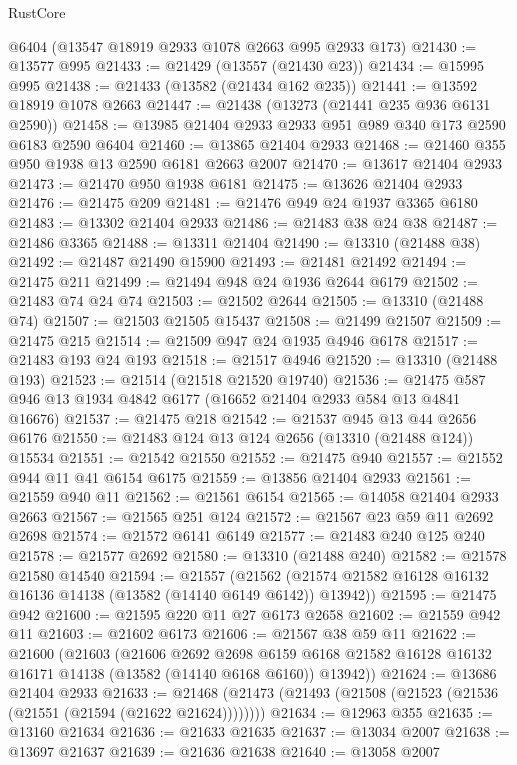 \begin{lexlean}{RustCore}
\begin{coremodule}
    @6404
    (@13547 @18919 @2933 @1078 @2663 @995 @2933 @173)
@21430 := @13577 @995
@21433 := @21429 (@13557 (@21430 @23))
@21434 := @15995 @995
@21438 := @21433 (@13582 (@21434 @162 @235))
@21441 := @13592 @18919 @1078 @2663
@21447 := @21438 (@13273 (@21441 @235 @936 @6131 @2590))
@21458 := @13985 @21404 @2933 @2933 @951 @989 @340 @173 @2590 @6183 @2590 @6404
@21460 := @13865 @21404 @2933
@21468 := @21460 @355 @950 @1938 @13 @2590 @6181 @2663 @2007
@21470 := @13617 @21404 @2933
@21473 := @21470 @950 @1938 @6181
@21475 := @13626 @21404 @2933
@21476 := @21475 @209
@21481 := @21476 @949 @24 @1937 @3365 @6180
@21483 := @13302 @21404 @2933
@21486 := @21483 @38 @24 @38
@21487 := @21486 @3365
@21488 := @13311 @21404
@21490 := @13310 (@21488 @38)
@21492 := @21487 @21490 @15900
@21493 := @21481 @21492
@21494 := @21475 @211
@21499 := @21494 @948 @24 @1936 @2644 @6179
@21502 := @21483 @74 @24 @74
@21503 := @21502 @2644
@21505 := @13310 (@21488 @74)
@21507 := @21503 @21505 @15437
@21508 := @21499 @21507
@21509 := @21475 @215
@21514 := @21509 @947 @24 @1935 @4946 @6178
@21517 := @21483 @193 @24 @193
@21518 := @21517 @4946
@21520 := @13310 (@21488 @193)
@21523 := @21514 (@21518 @21520 @19740)
@21536 := @21475 @587 @946 @13 @1934 @4842 @6177 (@16652 @21404 @2933 @584 @13 @4841 @16676)
@21537 := @21475 @218
@21542 := @21537 @945 @13 @44 @2656 @6176
@21550 := @21483 @124 @13 @124 @2656 (@13310 (@21488 @124)) @15534
@21551 := @21542 @21550
@21552 := @21475 @940
@21557 := @21552 @944 @11 @41 @6154 @6175
@21559 := @13856 @21404 @2933
@21561 := @21559 @940 @11
@21562 := @21561 @6154
@21565 := @14058 @21404 @2933 @2663
@21567 := @21565 @251 @124
@21572 := @21567 @23 @59 @11 @2692 @2698
@21574 := @21572 @6141 @6149
@21577 := @21483 @240 @125 @240
@21578 := @21577 @2692
@21580 := @13310 (@21488 @240)
@21582 := @21578 @21580 @14540
@21594 := @21557
    (@21562 (@21574 @21582 @16128 @16132 @16136 @14138 (@13582 (@14140 @6149 @6142)) @13942))
@21595 := @21475 @942
@21600 := @21595 @220 @11 @27 @6173 @2658
@21602 := @21559 @942 @11
@21603 := @21602 @6173
@21606 := @21567 @38 @59 @11
@21622 := @21600
    (@21603
      (@21606
        @2692
        @2698
        @6159
        @6168
        @21582
        @16128
        @16132
        @16171
        @14138
        (@13582 (@14140 @6168 @6160))
        @13942))
@21624 := @13686 @21404 @2933
@21633 := @21468 (@21473 (@21493 (@21508 (@21523 (@21536 (@21551 (@21594 (@21622 @21624))))))))
@21634 := @12963 @355
@21635 := @13160 @21634
@21636 := @21633 @21635
@21637 := @13034 @2007
@21638 := @13697 @21637
@21639 := @21636 @21638
@21640 := @13058 @2007

\end{coremodule}
\end{lexlean}
